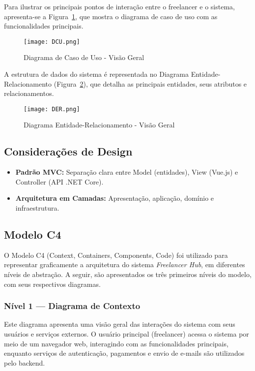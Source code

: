 \documentclass[a4paper,12pt]{article}
\begin{document}
Para ilustrar os principais pontos de interação entre o freelancer e o sistema, apresenta-se a Figura~\ref{fig:caso-uso}, que mostra o diagrama de caso de uso com as funcionalidades principais.

\begin{figure}[H]
  \centering
  \texttt{[image: DCU.png]}
  \caption{Diagrama de Caso de Uso - Visão Geral}
  \label{fig:caso-uso}
\end{figure}

A estrutura de dados do sistema é representada no Diagrama Entidade-Relacionamento (Figura~\ref{fig:der}), que detalha as principais entidades, seus atributos e relacionamentos.

\begin{figure}[H]
  \centering
  \texttt{[image: DER.png]}
  \caption{Diagrama Entidade-Relacionamento - Visão Geral}
  \label{fig:der}
\end{figure}

\subsection{Considerações de Design}
\begin{itemize}[nosep]
  \item \textbf{Padrão MVC:} Separação clara entre Model (entidades), View (Vue.js) e Controller (API .NET Core).
  \item \textbf{Arquitetura em Camadas:} Apresentação, aplicação, domínio e infraestrutura.
\end{itemize}

\subsection{Modelo C4}

O Modelo C4 (Context, Containers, Components, Code) foi utilizado para representar graficamente a arquitetura do sistema \textit{Freelancer Hub}, em diferentes níveis de abstração. A seguir, são apresentados os três primeiros níveis do modelo, com seus respectivos diagramas.

\subsubsection*{Nível 1 — Diagrama de Contexto}

Este diagrama apresenta uma visão geral das interações do sistema com seus usuários e serviços externos. O usuário principal (freelancer) acessa o sistema por meio de um navegador web, interagindo com as funcionalidades principais, enquanto serviços de autenticação, pagamentos e envio de e-mails são utilizados pelo backend.
\end{document}
